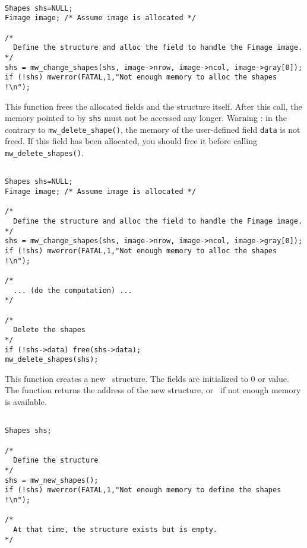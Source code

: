 \Next
\Example
\begin{verbatim}

Shapes shs=NULL;
Fimage image; /* Assume image is allocated */

/*
  Define the structure and alloc the field to handle the Fimage image.
*/
shs = mw_change_shapes(shs, image->nrow, image->ncol, image->gray[0]);
if (!shs) mwerror(FATAL,1,"Not enough memory to alloc the shapes !\n");

\end{verbatim}

\newpage %



\Description
This function frees the allocated fields and the
structure itself. 
After this call, the memory pointed to by \verb+shs+ must
not be accessed any longer.
Warning : in the contrary to \verb+mw_delete_shape()+, the memory of the 
user-defined field \verb+data+ is not freed.
If this field has been allocated, you should free it before calling
\verb+mw_delete_shapes()+.


\Next
\Example
\begin{verbatim}

Shapes shs=NULL;
Fimage image; /* Assume image is allocated */

/*
  Define the structure and alloc the field to handle the Fimage image.
*/
shs = mw_change_shapes(shs, image->nrow, image->ncol, image->gray[0]);
if (!shs) mwerror(FATAL,1,"Not enough memory to alloc the shapes !\n");

/*
  ... (do the computation) ...
*/

/* 
  Delete the shapes
*/
if (!shs->data) free(shs->data);
mw_delete_shapes(shs);

\end{verbatim}

\newpage %


\Description
This function creates a new \shapes\ structure. The fields are initialized
to $0$ or \Null value.
The function returns the address of the new structure, or
\Null\ if not enough memory is available.

\Next
\Example
\begin{verbatim}

Shapes shs;

/*
  Define the structure
*/
shs = mw_new_shapes();
if (!shs) mwerror(FATAL,1,"Not enough memory to define the shapes !\n");

/* 
  At that time, the structure exists but is empty.
*/
\end{verbatim}

\newpage %


